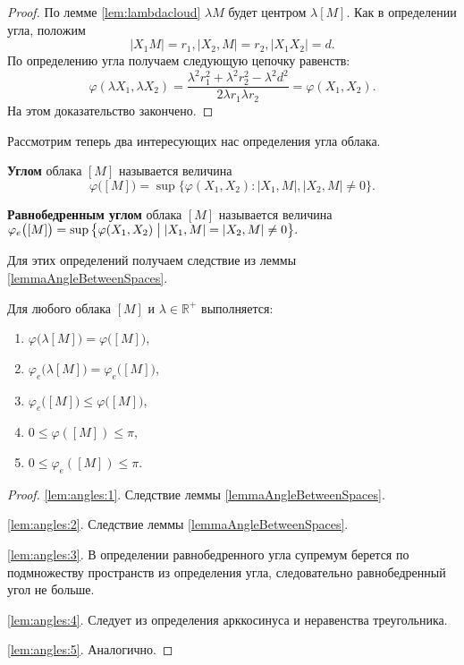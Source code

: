     \begin{proof}
        По лемме \ref{lem:lambdacloud} \( \lambda M \) будет центром \( \lambda
        [M]
        \). Как в определении угла, положим \[ |X_1 M| = r_1, | X_2, M | =r_2,
            |X_1
        X_2| = d.\] По определению угла получаем следующую цепочку
        равенств: \[ \varphi (\lambda X_1, \lambda X_2) = \frac{\lambda
            ^{2} r_1^2 + \lambda ^2 r_2^2 - \lambda^2 d^2}{2 \lambda  r_1
        \lambda r_2} =
        \varphi (X_1, X_2).
    \]
    На этом доказательство закончено.
\end{proof}
Рассмотрим теперь два интересующих нас определения угла облака.
\begin{defin}
    \textbf{Углом} облака $ [M] $ называется величина
    \[
        \varphi \big([M]\big)= \sup \big\{\varphi (X_1, X_2) \colon | X_1,M
        |, |X_2,M| \neq 0\big\}.
    \]
\end{defin}
\begin{defin}
    \textbf{Равнобедренным углом} облака $ [M] $ называется величина \(
    \varphi_e \big([M]\big) = \sup \big\{\varphi (X_1, X_2) \bigm| |X_1,M |
    = |X_2,M| \neq 0\big\}. \)
\end{defin}
Для этих определений получаем следствие из леммы \ref{lemmaAngleBetweenSpaces}.
\begin{lemma}
    Для любого облака \( [M] \) и \( \lambda \in\mathbb{R}^+ \)
    выполняется\textup{:}\label{lem:angles}
    \begin{enumerate}
        \item \(\varphi \big(\lambda [M]\big) = \varphi
            \big([M]\big)\),\label{lem:angles:1}
        \item \(\varphi_e \big(\lambda [M]\big) = \varphi_e
            \big([M]\big)\),\label{lem:angles:2}
        \item \( \varphi_e \big([M]\big) \le \varphi \big([M]\big)
            \),\label{lem:angles:3}
        \item \(0 \le \varphi ([M]) \le \pi\),\label{lem:angles:4}
        \item \(0 \le \varphi_e ([M]) \le \pi\).\label{lem:angles:5}
    \end{enumerate}
\end{lemma}
\begin{proof}
    \ref{lem:angles:1}. Следствие леммы \ref{lemmaAngleBetweenSpaces}.

    \ref{lem:angles:2}. Следствие леммы \ref{lemmaAngleBetweenSpaces}.

    \ref{lem:angles:3}. В определении равнобедренного угла супремум берется по
    подмножеству пространств из определения угла, следовательно равнобедренный
    угол не больше.

    \ref{lem:angles:4}.  Следует из определения арккосинуса и неравенства
    треугольника.

    \ref{lem:angles:5}. Аналогично.
\end{proof}
